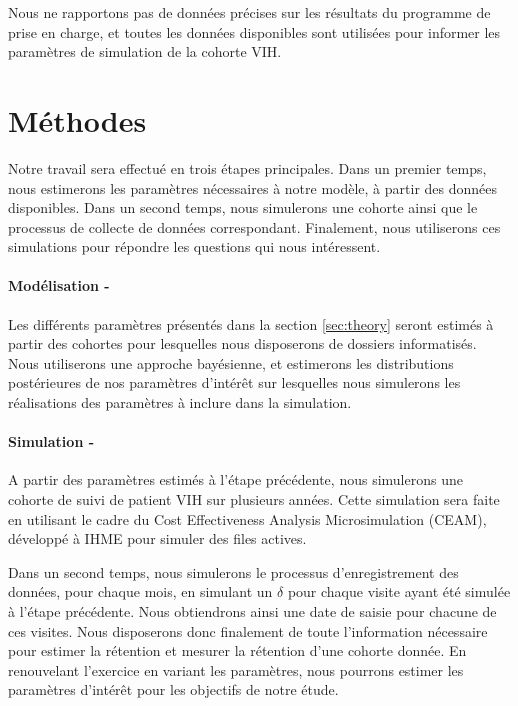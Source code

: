 \documentclass[paper=a4, fontsize=11pt]{scrartcl}
\numberwithin{equation}{section}		%
\numberwithin{figure}{section}			%
\numberwithin{table}{section}				%
\begin{document}
Nous ne rapportons pas de données précises sur les résultats du programme de prise en charge, et toutes les données disponibles sont utilisées pour informer les paramètres de simulation de la cohorte VIH.

\section{Méthodes}

Notre travail sera effectué en trois étapes principales. Dans un premier temps, nous estimerons les paramètres nécessaires à notre modèle, à partir des données disponibles. Dans un second temps, nous simulerons une cohorte ainsi que le processus de collecte de données correspondant. Finalement, nous utiliserons ces simulations pour répondre les questions qui nous intéressent.

\paragraph{Modélisation -} Les différents paramètres présentés dans la section \ref{sec:theory} seront estimés à partir des cohortes pour lesquelles nous disposerons de dossiers informatisés. Nous utiliserons une approche bayésienne, et estimerons les distributions postérieures de nos paramètres d'intérêt sur lesquelles nous simulerons les réalisations des paramètres à inclure dans la simulation.

\paragraph{Simulation -} A partir des paramètres estimés à l'étape précédente, nous simulerons une cohorte de suivi de patient VIH sur plusieurs années. Cette simulation sera faite en utilisant le cadre du Cost Effectiveness Analysis Microsimulation (CEAM), développé à IHME pour simuler des files actives.

Dans un second temps, nous simulerons le processus d'enregistrement des données, pour chaque mois, en simulant un  $\delta$ pour chaque visite ayant été simulée à l'étape précédente. Nous obtiendrons ainsi une date de saisie pour chacune de ces visites. Nous disposerons donc finalement de toute l'information nécessaire pour estimer la rétention et mesurer la rétention d'une cohorte donnée. En renouvelant l'exercice en variant les paramètres, nous pourrons estimer les paramètres d'intérêt pour les objectifs de notre étude.
\end{document}
